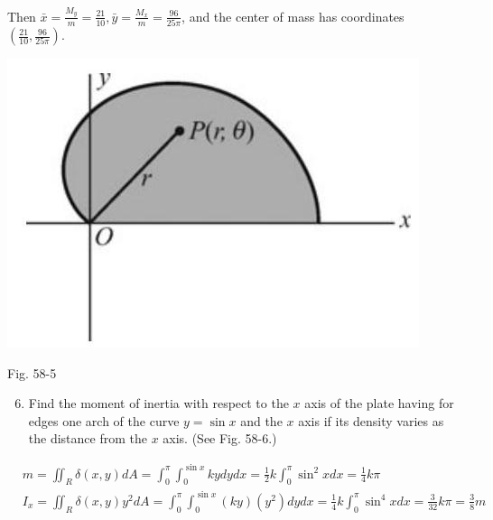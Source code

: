 \documentclass[10pt]{article}
\begin{document}
Then $\bar{x}=\frac{M_{y}}{m}=\frac{21}{10}, \bar{y}=\frac{M_{x}}{m}=\frac{96}{25 \pi}$, and the center of mass has coordinates $\left(\frac{21}{10}, \frac{96}{25 \pi}\right)$.

\begin{center}
\includegraphics[max width=\textwidth]{2024_04_20_fe2e8e718cc0fcd63d1bg-14(1)}
\end{center}

Fig. 58-5

\begin{enumerate}
  \setcounter{enumi}{5}
  \item Find the moment of inertia with respect to the $x$ axis of the plate having for edges one arch of the curve $y=\sin x$ and the $x$ axis if its density varies as the distance from the $x$ axis. (See Fig. 58-6.)
\end{enumerate}

$$
\begin{aligned}
& m=\iint_{R} \delta(x, y) d A=\int_{0}^{\pi} \int_{0}^{\sin x} k y d y d x=\frac{1}{2} k \int_{0}^{\pi} \sin ^{2} x d x=\frac{1}{4} k \pi \\
& I_{x}=\iint_{R} \delta(x, y) y^{2} d A=\int_{0}^{\pi} \int_{0}^{\sin x}(k y)\left(y^{2}\right) d y d x=\frac{1}{4} k \int_{0}^{\pi} \sin ^{4} x d x=\frac{3}{32} k \pi=\frac{3}{8} m
\end{aligned}
$$
\end{document}
